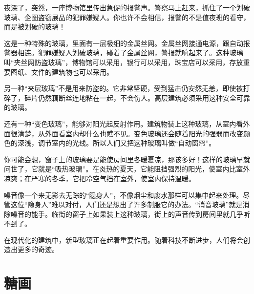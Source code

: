 \documentclass[12pt,UTF-8,openany]{ctexbook}
\begin{document}
\begin{Large}
    
    夜深了，突然，一座博物馆里传出急促的报警声。警察马上赶来，抓住了一个划破玻璃、企图盗窃展品的犯罪嫌疑人。你也许不会相信，报警的不是值夜班的看守，而是被划破的玻璃！
    
    这是一种特殊的玻璃，里面有一层极细的金属丝网。金属丝网接通电源，跟自动报警器相连。犯罪嫌疑人划破玻璃，碰着了金属丝网，警报就响起来了。这种玻璃叫“夹丝网防盗玻璃”，博物馆可以采用，银行可以采用，珠宝店可以采用，存放重要图纸、文件的建筑物也可以采用。
    
    另一种“夹层玻璃”不是用来防盗的。它非常坚硬，受到猛击仍安然无恙，即使被打碎了，碎片仍然藕断丝连地粘在一起，不会伤人。高层建筑必须采用这种安全可靠的玻璃。
    
    还有一种“变色玻璃”，能够对阳光起反射作用。建筑物装上这种玻璃，从室内看外面很清楚，从外面看室内却什么也瞧不见。变色玻璃还会随着阳光的强弱而改变颜色的深浅，调节室内的光线。所以人们又把这种玻璃叫做“自动窗帘”。
    
    你可能会想，窗子上的玻璃要是能使房间里冬暖夏凉，那该多好！这样的玻璃早就问世了，它就是“吸热玻璃”。在炎热的夏天，它能阻挡强烈的阳光，使室内比室外凉爽；在严寒的冬季，它把冷空气挡在室外，使室内保持温暖。
    
    噪音像一个来无影去无踪的“隐身人”，不像烟尘和废水那样可以集中起来处理。尽管这位“隐身人”难以对付，人们还是想出了许多制服它的办法。“消音玻璃”就是消除噪音的能手。临街的窗子上如果装上这种玻璃，街上的声音传到房间里就几乎听不到了。
    
    在现代化的建筑中，新型玻璃正在起着重要作用。随着科技不断进步，人们将会创造出更多的奇迹。
    
\end{Large}

\chapter{糖画}
\end{document}
